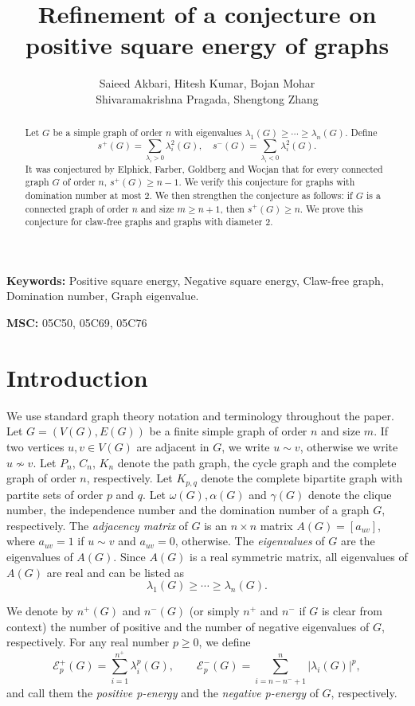\documentclass{article}
\title{Refinement of a conjecture on positive square energy of graphs}
\author{Saieed Akbari, Hitesh Kumar, Bojan Mohar \\ Shivaramakrishna Pragada, Shengtong Zhang}
\date{}
\begin{document}
\maketitle

\begin{abstract}
Let $G$ be a simple graph of order $n$ with eigenvalues $\lambda_1(G)\geq \cdots \geq \lambda_n(G)$. Define 
\[s^+(G)=\sum_{\lambda_i >0}   \lambda_i^2(G),  \quad  s^-(G)=\sum_{\lambda_i<0} \lambda_i^2(G).\]
 It was conjectured by Elphick, Farber, Goldberg and Wocjan that for every connected graph $G$ of order $n$, $s^+(G) \ge n-1.$ We verify this conjecture for graphs with domination number at most 2. We then strengthen the conjecture as follows: if $G$ is a connected graph of order $n$ and size $m \geq n+1$, then $s^+(G) \geq n$. We prove this conjecture for claw-free graphs and graphs with diameter 2. 
\end{abstract}

\noindent
\textbf{Keywords:} Positive square energy, Negative square energy, Claw-free graph, Domination number, Graph eigenvalue.

\noindent 
\textbf{MSC:} 05C50, 05C69, 05C76 

\section{Introduction}

We use standard graph theory notation and terminology throughout the paper. Let $G = (V(G), E(G))$ be a finite simple graph of order $n$ and size $m$. If two vertices $u, v\in V(G)$ are adjacent in $G$, we write $u\sim v$, otherwise we write $u\nsim v$. Let $P_n$, $C_n$, $K_n$ denote the path graph, the cycle graph and the complete graph of order $n$, respectively. Let $K_{p,q}$ denote the complete bipartite graph with partite sets of order $p$ and  $q$. Let $\omega(G), \alpha(G)$ and $\gamma(G)$ denote the clique number, the independence number and the domination number of a graph $G$, respectively. The \textit{adjacency matrix} of $G$ is an $n\times n$ matrix $A(G) = [a_{uv}]$, where $a_{uv} = 1$ if $u\sim v$ and $a_{uv} = 0$, otherwise. The \emph{eigenvalues} of $G$ are the eigenvalues of $A(G)$. Since $A(G)$ is a real symmetric matrix, all eigenvalues of $A(G)$ are real and can be listed as 
\[\lambda_1(G) \geq  \cdots \geq \lambda_n(G).\] 

We denote by $n^+(G)$ and $n^-(G)$ (or simply $n^+$ and $n^-$ if $G$ is clear from context) the number of positive and the number of negative eigenvalues of $G$, respectively. For any real number $p\ge 0$, we define 
\[\mathcal{E}_p^+(G)=\sum_{i=1}^{n^+} \lambda_i^p(G), \qquad \mathcal{E}_p^-(G)=\sum_{i=n-n^-+1}^n |\lambda_i(G)|^p,\]
 and call them the \emph{positive p-energy} and the \emph{negative p-energy} of $G$, respectively.
\end{document}
